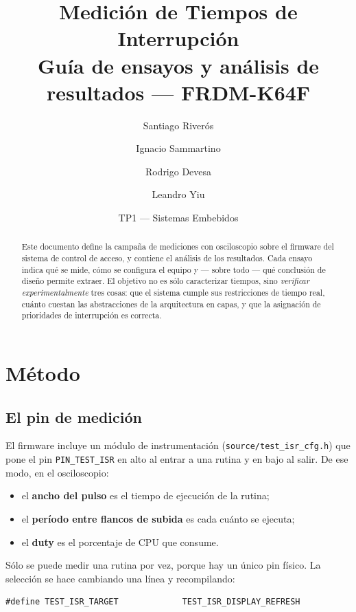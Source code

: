 \documentclass[11pt,a4paper]{article}
\title{\textbf{Medición de Tiempos de Interrupción}\\[4pt]
\large Guía de ensayos y análisis de resultados --- FRDM-K64F}
\author{Santiago Riverós \and Ignacio Sammartino \and Rodrigo Devesa \and Leandro Yiu}
\date{TP1 --- Sistemas Embebidos}
\begin{document}
\maketitle

\begin{abstract}
\noindent
Este documento define la campaña de mediciones con osciloscopio sobre el
firmware del sistema de control de acceso, y contiene el análisis de los
resultados. Cada ensayo indica qué se mide, cómo se configura el equipo y
--- sobre todo --- qué conclusión de diseño permite extraer. El objetivo no
es sólo caracterizar tiempos, sino \emph{verificar experimentalmente} tres
cosas: que el sistema cumple sus restricciones de tiempo real, cuánto cuestan
las abstracciones de la arquitectura en capas, y que la asignación de
prioridades de interrupción es correcta.
\end{abstract}

\tableofcontents
\newpage

\section{Método}

\subsection{El pin de medición}

El firmware incluye un módulo de instrumentación (\texttt{source/test\_isr\_cfg.h})
que pone el pin \texttt{PIN\_TEST\_ISR} en alto al entrar a una rutina y en
bajo al salir. De ese modo, en el osciloscopio:

\begin{itemize}
  \item el \textbf{ancho del pulso} es el tiempo de ejecución de la rutina;
  \item el \textbf{período entre flancos de subida} es cada cuánto se ejecuta;
  \item el \textbf{duty} es el porcentaje de CPU que consume.
\end{itemize}

Sólo se puede medir una rutina por vez, porque hay un único pin físico. La
selección se hace cambiando una línea y recompilando:

\begin{lstlisting}[caption={Selección de la rutina a medir en \texttt{test\_isr\_cfg.h}.}]
#define TEST_ISR_TARGET             TEST_ISR_DISPLAY_REFRESH
\end{lstlisting}
\end{document}
